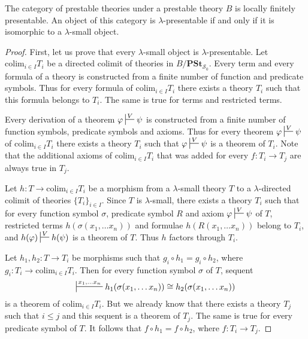 \documentclass[reqno]{amsart}
\theoremstyle{definition}
\theoremstyle{remark}
\newcommand{\cat}[1]{\mathbf{#1}}
\newcommand{\colim}{\mathrm{colim}}
\newcommand{\PSt}{\cat{PSt}}
\numberwithin{figure}{section}
\begin{document}
\begin{prop}
The category of prestable theories under a prestable theory $B$ is locally finitely presentable.
An object of this category is $\lambda$-presentable if and only if it is isomorphic to a $\lambda$-small object.
\end{prop}
\begin{proof}
First, let us prove that every $\lambda$-small object is $\lambda$-presentable.
Let $\colim_{i \in I} T_i$ be a directed colimit of theories in $B/\PSt_{\mathcal{S}_0}$.
Every term and every formula of a theory is constructed from a finite number of function and predicate symbols.
Thus for every formula of $\colim_{i \in I} T_i$ there exists a theory $T_i$ such that this formula belongs to $T_i$.
The same is true for terms and restricted terms.

Every derivation of a theorem $\varphi \sststile{}{V} \psi$ is constructed from a finite number of function symbols, predicate symbols and axioms.
Thus for every theorem $\varphi \sststile{}{V} \psi$ of $\colim_{i \in I} T_i$ there exists a theory $T_i$ such that $\varphi \sststile{}{V} \psi$ is a theorem of $T_i$.
Note that the additional axioms of $\colim_{i \in I} T_i$ that was added for every $f : T_i \to T_j$ are always true in $T_j$.

Let $h : T \to \colim_{i \in I} T_i$ be a morphism from a $\lambda$-small theory $T$ to a $\lambda$-directed colimit of theories $\{ T_i \}_{i \in I}$.
Since $T$ is $\lambda$-small, there exists a theory $T_i$ such that for every function symbol $\sigma$, predicate symbol $R$ and axiom $\varphi \sststile{}{V} \psi$ of $T$,
restricted terms $h(\sigma(x_1, \ldots x_n))$ and formulae $h(R(x_1, \ldots x_n))$ belong to $T_i$, and $h(\varphi) \sststile{}{V} h(\psi)$ is a theorem of $T$.
Thus $h$ factors through $T_i$.

Let $h_1,h_2 : T \to T_i$ be morphisms such that $g_i \circ h_1 = g_i \circ h_2$, where $g_i : T_i \to \colim_{i \in I} T_i$.
Then for every function symbol $\sigma$ of $T$, sequent
\[ \sststile{}{x_1, \ldots x_n} h_1(\sigma(x_1, \ldots x_n)) \cong h_2(\sigma(x_1, \ldots x_n)) \]
is a theorem of $\colim_{i \in I} T_i$.
But we already know that there exists a theory $T_j$ such that $i \leq j$ and this sequent is a theorem of $T_j$.
The same is true for every predicate symbol of $T$.
It follows that $f \circ h_1 = f \circ h_2$, where $f : T_i \to T_j$.


\end{proof}
\end{document}
